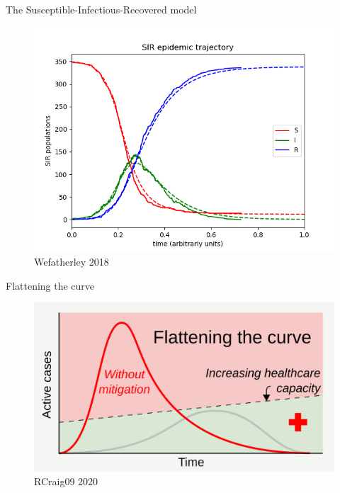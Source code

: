 \documentclass[
  ignorenonframetext,
  aspectratio=54,
]{beamer}
\begin{document}
\begin{frame}{The Susceptible-Infectious-Recovered model}
\protect\hypertarget{the-susceptible-infectious-recovered-model}{}
\begin{figure}
\centering
\includegraphics[width=\textwidth,height=0.8\textheight]{exhibit/fig/SIR_trajectory.png}
\caption{Wefatherley 2018}
\end{figure}
\end{frame}

\begin{frame}{Flattening the curve}
\protect\hypertarget{flattening-the-curve}{}
\begin{figure}
\centering
\includegraphics{exhibit/fig/flatten1.png}
\caption{RCraig09 2020}
\end{figure}
\end{frame}
\end{document}
